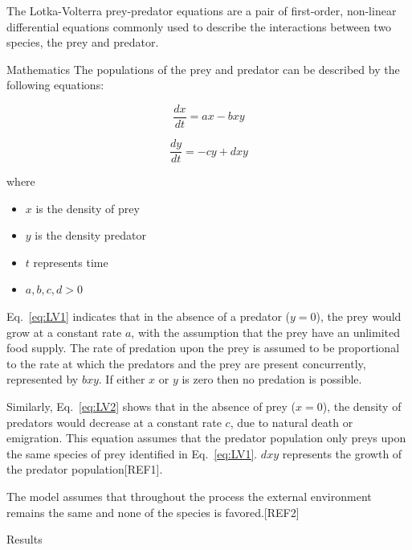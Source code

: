 \documentclass[11pt]{article}
\begin{document}
The Lotka-Volterra prey-predator equations are a pair of first-order, non-linear differential equations commonly used to describe the interactions between two species, the prey and predator.
\break

Mathematics
\break
The populations of the prey and predator can be described by the following equations:

    \begin{equation}
      \frac{dx}{dt} = ax - bxy
      \label{eq:LV1}
    \end{equation}
    
     \begin{equation}
      \frac{dy}{dt} = -cy + dxy
      \label{eq:LV2}
    \end{equation}
    

where
\begin{itemize}
\item $x$ is the density of prey
\item $y$ is the density predator
\item $t$ represents time
\item $a, b, c, d >0$ 
\end{itemize}

Eq.~\ref{eq:LV1} indicates that in the absence of a predator ($y = 0$), the prey would grow at a constant rate $a$, with the assumption that the prey have an unlimited food supply. The rate of predation upon the prey is assumed to be proportional to the rate at which the predators and the prey are present concurrently, represented by $bxy$. If either $x$ or $y$ is zero then no predation is possible.

Similarly, Eq.~\ref{eq:LV2} shows that in the absence of prey ($x = 0$), the density of predators would decrease at a constant rate $c$, due to natural death or emigration. This equation assumes that the predator population only preys upon the same species of prey identified in Eq.~\ref{eq:LV1}. $dxy$ represents the growth of the predator population[REF1].

The model assumes that throughout the process the external environment remains the same and none of the species is favored.[REF2]

Results 
\break
\end{document}
